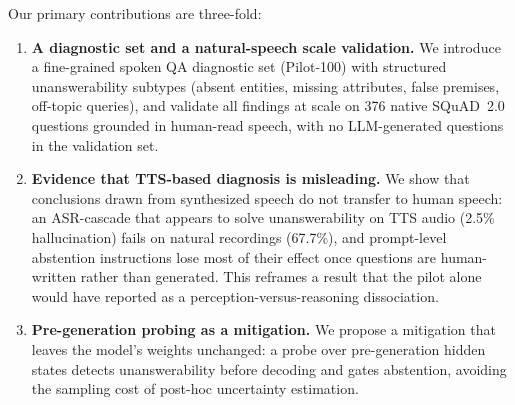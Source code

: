 Our primary contributions are three-fold:
\begin{enumerate}
    \item \textbf{A diagnostic set and a natural-speech scale validation.} We introduce a fine-grained spoken QA diagnostic set (Pilot-100) with structured unanswerability subtypes (absent entities, missing attributes, false premises, off-topic queries), and validate all findings at scale on 376 native SQuAD~2.0 questions grounded in human-read speech, with no LLM-generated questions in the validation set.
    \item \textbf{Evidence that TTS-based diagnosis is misleading.} We show that conclusions drawn from synthesized speech do not transfer to human speech: an ASR-cascade that appears to solve unanswerability on TTS audio (2.5\% hallucination) fails on natural recordings (67.7\%), and prompt-level abstention instructions lose most of their effect once questions are human-written rather than generated. This reframes a result that the pilot alone would have reported as a perception-versus-reasoning dissociation.
    \item \textbf{Pre-generation probing as a mitigation.} We propose a mitigation that leaves the model's weights unchanged: a probe over pre-generation hidden states detects unanswerability before decoding and gates abstention, avoiding the sampling cost of post-hoc uncertainty estimation.
\end{enumerate}
